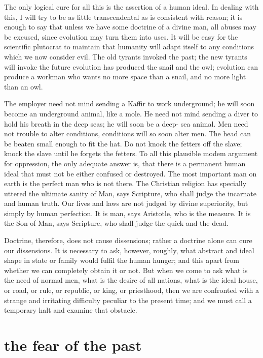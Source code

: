 \documentclass[final,10pt,letterpaper,twocolumn,openany]{book}
\begin{document}
The only logical cure for all this is the assertion of a human ideal. In
dealing with this, I will try to be as little transcendental as is consistent
with reason; it is enough to say that unless we have some doctrine of a
divine man, all abuses may be excused, since evolution may turn them into
uses. It will be easy for the scientific plutocrat to maintain that humanity
will adapt itself to any conditions which we now consider evil. The old
tyrants invoked the past; the new tyrants will invoke the future evolution
has produced the snail and the owl; evolution can produce a workman who
wants no more space than a snail, and no more light than an owl. 

The
employer need not mind sending a Kaffir to work underground; he will
soon become an underground animal, like a mole. He need not mind
sending a diver to hold his breath in the deep seas; he will soon be a deep-
sea animal. Men need not trouble to alter conditions, conditions will so
soon alter men. The head can be beaten small enough to fit the hat. Do not
knock the fetters off the slave; knock the slave until he forgets the fetters.
To all this plausible modem argument for oppression, the only adequate
answer is, that there is a permanent human ideal that must not be either
confused or destroyed. The most important man on earth is the perfect
man who is not there. The Christian religion has specially uttered the
ultimate sanity of Man, says Scripture, who shall judge the incarnate and
human truth. Our lives and laws are not judged by divine superiority, but
simply by human perfection. It is man, says Aristotle, who is the measure.
It is the Son of Man, says Scripture, who shall judge the quick and the
dead.

Doctrine, therefore, does not cause dissensions; rather a doctrine alone
can cure our dissensions. It is necessary to ask, however, roughly, what
abstract and ideal shape in state or family would fulfil the human hunger;
and this apart from whether we can completely obtain it or not. But when
we come to ask what is the need of normal men, what is the desire of all
nations, what is the ideal house, or road, or rule, or republic, or king, or
priesthood, then we are confronted with a strange and irritating difficulty
peculiar to the present time; and we must call a temporary halt and
examine that obstacle.

\section{the fear of the past}
\end{document}
